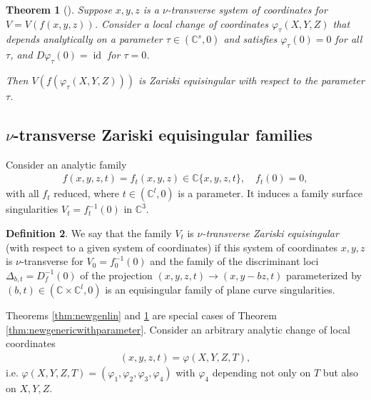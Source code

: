 \documentclass[11pt,a4paper]{amsart}
\newcommand{\1}{{1\!\!1}}
\numberwithin{equation}{section}
\theoremstyle{plain}%
\newtheorem{thm}{Theorem}[section]
\theoremstyle{definition}
\theoremstyle{definition}
\newtheorem{defn}[thm]{Definition}
\theoremstyle{remark}
\newcommand{\C}{\mathbb{C}}
\renewcommand{\1}{\mathbf{1}}
\newcommand{\inv}{^{-1}}
\DeclareMathOperator{\id}{id}
\newcommand{\impli}{\varphi}
\newcommand{\unt}{$\nu$-transverse }
\begin{document}
\begin{thm}[{\cite[Theorem 4.4]{PP24}}]\label{thm:newgeneric}
Suppose $x,y,z$ is a \unt system of coordinates for $V= V(f(x,y,z))$.  Consider a local change of coordinates $\impli_\tau  (X,Y,Z) $ that depends analytically on a parameter 
$\tau\in (\C^s,0)$ and satisfies $\impli_\tau  (0)=0$ for all $\tau$, and $D\varphi_\tau  (0)=\id$ for $\tau =0$.  

Then $V(f(\impli_\tau  (X,Y,Z)))$ is Zariski equisingular with respect to the parameter $\tau $.  
\end{thm} 




\subsection{\unt Zariski equisingular families}
\label{ssec:newZEfamiliesdim2}

Consider an analytic family 
\begin{align}\label{eq:newfwithparameter}
f(x,y,z, t)= f_t(x,y,z) \in \C\{x,y,z,t\}, \quad f_t(0)=0,
\end{align} 
with all $f_t$ reduced, where $t\in (\C^l,0)$ is a parameter. It induces a family surface singularities $V_t=f_t\inv  (0)$ in $\C^3$.  


\begin{defn} \label{defn:newsnt-genericZE}
We say that the family $V_t$ is \emph{\unt Zariski equisingular} (with respect to a given system of coordinates) if this  system of coordinates 
$x,y,z$ is \unt for $V_0= f_0^{-1} (0)$ and the family of the discriminant loci $\Delta_{b,t} = 
D_f\inv (0)$ of the projection 
$(x,y,z,t) \to (x, y-bz,t)$  parameterized by $(b,t) \in (\C\times \C ^l,0)$ 
is an equisingular family of plane curve singularities.    
\end{defn}

Theorems \ref{thm:newgenlin} and \ref{thm:newgeneric} are special cases of Theorem 
\ref{thm:newgenericwithparameter}. 
Consider an arbitrary  analytic change of local coordinates 
\begin{align}\label{eq:newchange} (x,y,z,t) = \impli (X,Y,Z,T), 
\end{align}
i.e.  $\impli (X,Y,Z,T)  = (\impli_1, \impli_2, \impli_3, \impli_4)$ with $\impli_4 $ 
depending not only on $T$ but also on $X,Y,Z$.  
\end{document}
